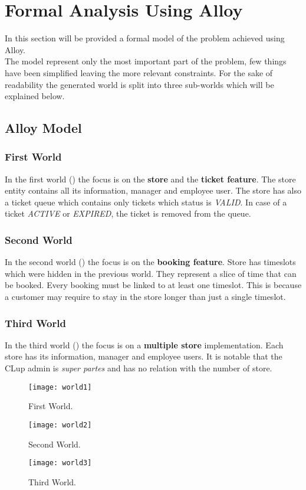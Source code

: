 \chapter{Formal Analysis Using Alloy}
In this section will be provided a formal model of the problem achieved using Alloy. \\
The model represent only the most important part of the problem, few things have been simplified leaving the more relevant constraints.\newline
For the sake of readability the generated world is split into three sub-worlds which will be explained below.

\section{Alloy Model}


\subsection{First World}
In the first world () the focus is on the \textbf{store} and the \textbf{ticket feature}. The store entity contains all its information, manager and employee user. The store has also a ticket queue which contains only tickets which status is \textit{VALID}.
In case of a ticket \textit{ACTIVE} or \textit{EXPIRED}, the ticket is removed from the queue.
\subsection{Second World}
In the second world () the focus is on the \textbf{booking feature}. Store has timeslots which were hidden in the previous world. They represent a slice of time that can be booked.
Every booking must be linked to at least one timeslot. This is because a customer may require to stay in the store longer than just a single timeslot.

\subsection{Third World}
In the third world () the focus is on a \textbf{multiple store} implementation. Each store has its information, manager and employee users. It is notable that the CLup admin is \textit{super partes} and has no relation with the number of store.

\begin{figure}[H]
	\centering
	\texttt{[image: world1]}
	\caption{First World.}
	\label{fig:world1}
\end{figure}
\begin{figure}[H]
	\centering
	\texttt{[image: world2]}
	\caption{Second World.}
	\label{fig:world2}
\end{figure}
\begin{figure}[H]
	\centering
	\texttt{[image: world3]}
	\caption{Third World.}
	\label{fig:world3}
\end{figure}